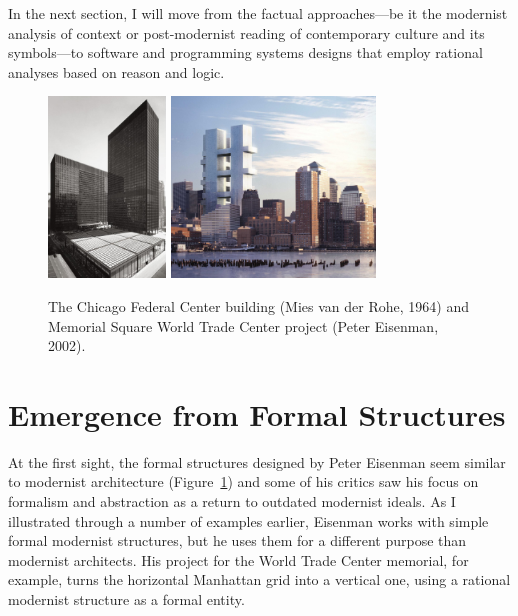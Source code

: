 In the next section, I will move from the factual approaches---be it the modernist analysis
of context or post-modernist reading of contemporary culture and its symbols---to software and
programming systems designs that employ rational analyses based on reason and logic.

\begin{figure}
\centering
\includegraphics[height=13em]{fig/federal.jpg}\quad
\includegraphics[height=13em]{fig/wtc.jpg}
\caption{The Chicago Federal Center building (Mies van der Rohe, 1964) and Memorial Square World Trade
Center project (Peter Eisenman, 2002).}
\label{fig:wtc}
\end{figure}

\section{Emergence from Formal Structures}
At the first sight, the formal structures designed by Peter Eisenman seem similar to modernist
architecture (Figure~\ref{fig:wtc}) and some of his critics saw his focus on formalism and
abstraction as a return to outdated modernist ideals. As I illustrated through a number of examples
earlier, Eisenman works with simple formal modernist structures, but he uses them for a different
purpose than modernist architects. His project for the World Trade Center memorial, for
example, turns the horizontal Manhattan grid into a vertical one, using a rational modernist
structure as a formal entity.

